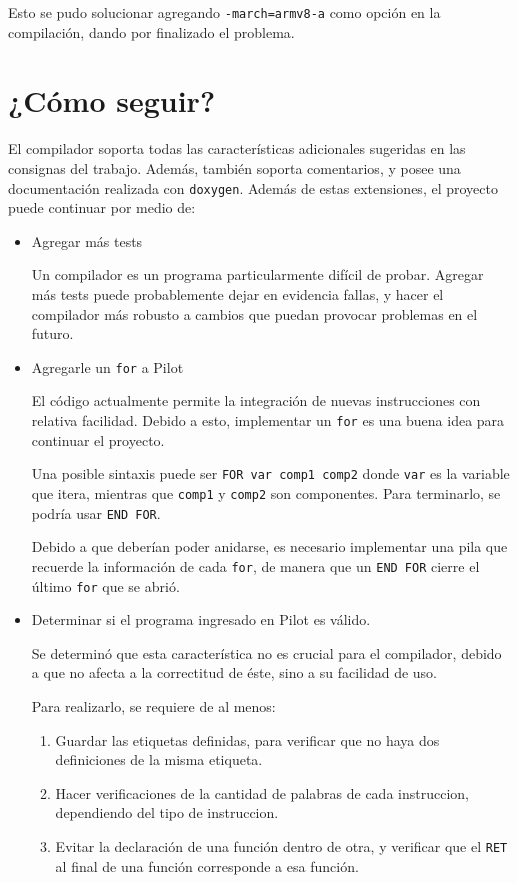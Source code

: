 \documentclass[12pt,spanish]{article}
\begin{document}
Esto se pudo solucionar agregando \texttt{-march=armv8-a} como opción en la compilación, dando por finalizado el problema.

\section{¿Cómo seguir?}
El compilador soporta todas las características adicionales sugeridas en las consignas del trabajo. Además, también soporta comentarios, y posee una documentación realizada con \texttt{doxygen}.
Además de estas extensiones, el proyecto puede continuar por medio de:
\begin{itemize}
\item{Agregar más tests}

Un compilador es un programa particularmente difícil de probar. Agregar más tests puede probablemente dejar en evidencia fallas, y hacer el compilador más robusto a cambios que puedan provocar problemas en el futuro.

\item{Agregarle un \texttt{for} a Pilot}

El código actualmente permite la integración de nuevas instrucciones con relativa facilidad. Debido a esto, implementar un \texttt{for} es una buena idea para continuar el proyecto. 

Una posible sintaxis puede ser \texttt{FOR var comp1 comp2} donde \texttt{var} es la variable que itera, mientras que \texttt{comp1} y \texttt{comp2} son componentes. Para terminarlo, se podría usar \texttt{END FOR}.

Debido a que deberían poder anidarse, es necesario implementar una pila que recuerde la información de cada \texttt{for}, de manera que un \texttt{END FOR} cierre el último \texttt{for} que se abrió.

\item{Determinar si el programa ingresado en Pilot es válido.}

Se determinó que esta característica no es crucial para el compilador, debido a que no afecta a la correctitud de éste, sino a su facilidad de uso.

Para realizarlo, se requiere de al menos:
\begin{enumerate}
\item{Guardar las etiquetas definidas, para verificar que no haya dos definiciones de la misma etiqueta.}
\item{Hacer verificaciones de la cantidad de palabras de cada instruccion, dependiendo del tipo de instruccion.}
\item{Evitar la declaración de una función dentro de otra, y verificar que el \texttt{RET} al final de una función corresponde a esa función.}
\end{enumerate}


\end{itemize}
\end{document}
